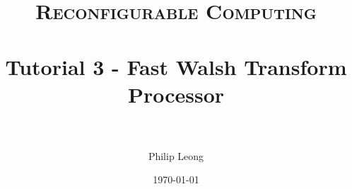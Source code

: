 \documentclass[paper=a4, fontsize=11pt]{scrartcl} %
\title{	
\normalfont \normalsize 
\textsc{Reconfigurable Computing} \\ [25pt] %
\horrule{0.5pt} \\[0.4cm] %
\huge Tutorial 3 - Fast Walsh Transform Processor \\ %
\horrule{2pt} \\[0.5cm] %
}
\author{Philip Leong} %
\date{\normalsize\today} %
\begin{document}
\maketitle %




{}

\end{document}
